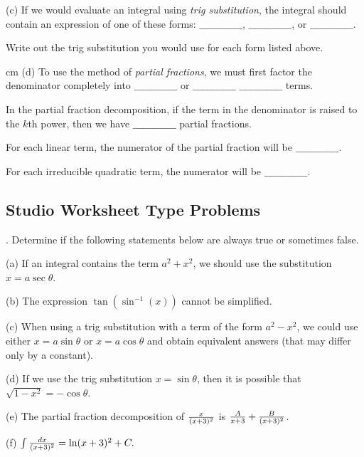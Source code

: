 \documentclass[12pt]{article}
\begin{document}
\bigskip
\noindent (c) If we would evaluate an integral using {\it trig 
substitution\/}, the 
integral should contain an expression of one of these forms:
$\_\_\_\_\_\_\_\_\_\_\_\_\_$, $\_\_\_\_\_\_\_\_\_\_\_\_\_$, or 
$\_\_\_\_\_\_\_\_\_\_\_\_\_$.

\bigskip
\noindent Write out the trig substitution you would use for each form listed 
above.

 cm
\noindent (d) To use the method of {\it partial fractions\/}, we must first 
factor the denominator completely into $\_\_\_\_\_\_\_\_\_\_\_\_\_$ or 
$\_\_\_\_\_\_\_\_\_\_\_\_\_$ $\_\_\_\_\_\_\_\_\_\_\_\_\_$ terms. 

\bigskip
\noindent In the partial fraction decomposition, if the term in the 
denominator is raised to the $k$th power, then we have 
$\_\_\_\_\_\_\_\_\_\_\_\_\_$ partial fractions. 

\bigskip
\noindent For each linear term, the numerator of the partial fraction will 
be $\_\_\_\_\_\_\_\_\_\_\_\_\_$.

\bigskip
\noindent For each irreducible quadratic term, the numerator will be 
$\_\_\_\_\_\_\_\_\_\_\_\_\_$.

\subsection*{Studio Worksheet Type Problems}

.  Determine if the following statements below are always true 
or sometimes false.

\noindent (a) If an integral contains the term $a^2+x^2$, we should use 
the substitution $x=a \sec \theta$.

\smallskip
\noindent (b) The expression $\tan \left ( \sin^{-1} (x) \right )$ cannot 
be simplified.

\smallskip
\noindent (c) When using a trig substitution with a term of the form 
$a^2-x^2$, we could use either $x=a \sin \theta$ or $x= a 
\cos \theta$ and obtain equivalent answers (that may differ only by a 
constant).

\smallskip
\noindent (d) If we use the trig substitution $x = \sin \theta$, then 
it is possible that $\sqrt{1-x^2} = -\cos \theta$. 

\smallskip
\noindent (e) The partial fraction decomposition of ${{x}\over{(x+3)^2}}$ 
is ${{A}\over{x+3}} + {{B}\over{(x+3)^2}}$.

\smallskip
\noindent (f) $\int {{dx}\over{(x+3)^2}} = \ln (x+3)^2 + C.$
\end{document}
